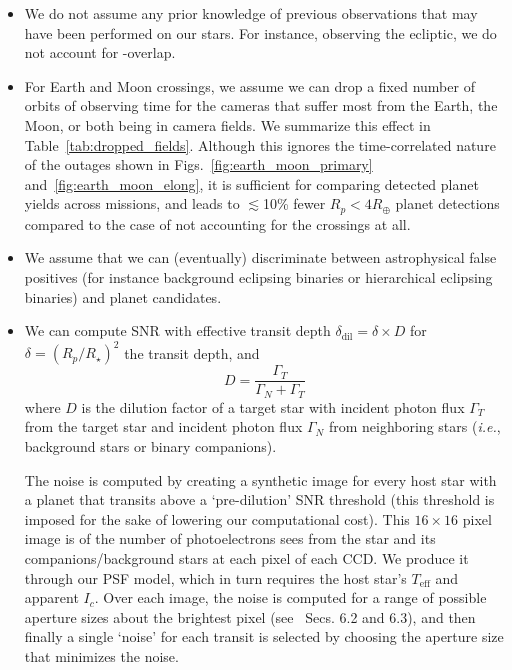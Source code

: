 \begin{itemize}
\begin{itemize}
          
	\end{itemize}

	\item We do not assume any prior knowledge of previous
          observations that may have been performed on our stars.  For
          instance, observing the ecliptic, we do not account for
          \tess\!-\ktwo overlap.
          
	\item For Earth and Moon crossings, we assume we can drop a
          fixed number of orbits of observing time for the cameras
          that suffer most from the Earth, the Moon, or both being in
          \tesss camera fields. We summarize this effect in
          Table~\ref{tab:dropped_fields}. Although this ignores the
          time-correlated nature of the outages shown in
          Figs.~\ref{fig:earth_moon_primary}
          and~\ref{fig:earth_moon_elong}, it is sufficient for
          comparing detected planet yields across missions, and
          leads to $\lesssim$10\% fewer $R_p<4R_\oplus$ planet 
          detections compared to the case of not accounting for the 
          crossings at all.
          
	\item We assume that we can (eventually) discriminate between
          astrophysical false positives (for instance background
          eclipsing binaries or hierarchical eclipsing binaries) and
          planet candidates.
          
	\item We can compute SNR with effective transit depth
          $\delta_\text{dil} = \delta \times D$ for
          $\delta=(R_p/R_\star)^2$ the transit depth, and
	  \begin{equation}
	D = \frac{\Gamma_T}{\Gamma_N + \Gamma_T}
	\label{eq:dilution}
	\end{equation}
	where $D$ is the dilution factor of a target star with
        incident photon flux $\Gamma_T$ from the target star and
        incident photon flux $\Gamma_N$ from neighboring stars 
        (\textit{i.e.}, background stars or binary companions).
	
	The noise is computed by creating a synthetic image for every
        host star with a planet that transits above a `pre-dilution'
        SNR threshold (this threshold is imposed for the sake of
        lowering our computational cost).  This $16\times16$ pixel
        image is of the number of photoelectrons \tess sees from the
        star and its companions/background stars at each pixel of each
        CCD.  We produce it through our PSF model, which in turn
        requires the host star's $T_\mathrm{eff}$ and apparent $I_c$.
        Over each image, the noise is computed for a range of possible
        aperture sizes about the brightest pixel
        (see~ Secs. 6.2 and 6.3), and then
        finally a single `noise' for each transit is selected by
        choosing the aperture size that minimizes the noise.

\end{itemize}
